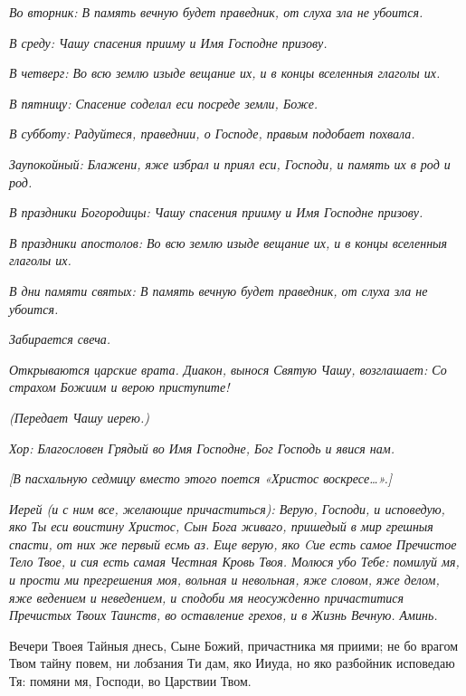  \itshape Во вторник:\normalfont{} В память вечную будет праведник, от слуха зла не
убоится.


 \itshape В среду:\normalfont{} Чашу спасения прииму и Имя Господне призову.


 \itshape В четверг:\normalfont{} Во всю землю изыде вещание их, и в концы вселенныя глаголы
их.


 \itshape В пятницу:\normalfont{} Спасение соделал еси посреде земли, Боже.


 \itshape В субботу:\normalfont{} Радуйтеся, праведнии, о Господе, правым подобает
похвала.


 \itshape Заупокойный:\normalfont{} Блажени, яже избрал и приял еси, Господи, и память их в
род и род.


 \itshape В праздники Богородицы:\normalfont{} Чашу спасения прииму и Имя Господне
призову.


 \itshape В праздники апостолов:\normalfont{} Во всю землю изыде вещание их, и в концы
вселенныя глаголы их.


 \itshape В дни памяти святых:\normalfont{} В память вечную будет праведник, от слуха зла не
убоится.


 \itshape Забирается свеча\normalfont{}.


 \itshape Открываются царские врата. Диакон, вынося Святую Чашу, возглашает:\normalfont{}
Со страхом Божиим и верою приступите!


 \itshape (Передает Чашу иерею.)\normalfont{}


 \itshape Хор:\normalfont{} Благословен Грядый во Имя Господне, Бог Господь и явися
нам.


 \itshape [В пасхальную седмицу вместо этого поется «Христос воскресе…».]\normalfont{}


 \itshape Иерей (и с ним все, желающие причаститься):\normalfont{} Верую, Господи, и
исповедую, яко Ты еси воистину Христос, Сын Бога живаго, пришедый в
мир грешныя спасти, от них же первый есмь аз. Еще верую, яко Cие есть
самое Пречистое Тело Твое, и сия есть самая Честная Кровь Твоя. Молюся
убо Тебе: помилуй мя, и прости ми прегрешения моя, вольная и невольная,
яже словом, яже делом, яже ведением и неведением, и сподоби мя
неосужденно причаститися Пречистых Твоих Таинств, во оставление грехов,
и в Жизнь Вечную. Аминь.


   Вечери Твоея Тайныя днесь, Сыне Божий, причастника мя приими;
не бо врагом Твом тайну повем, ни лобзания Ти дам, яко Ииуда,
но яко разбойник исповедаю Тя: помяни мя, Господи, во Царствии
Твом.


